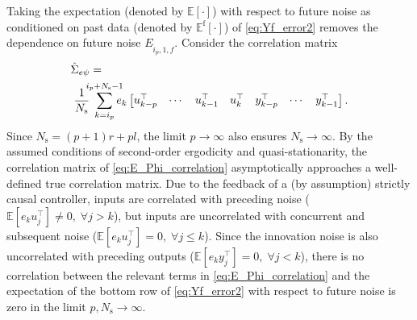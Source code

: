 Taking the expectation (denoted by $\mathbb{E}[\cdot]$) with respect to future noise as conditioned on past data (denoted by $\mathbb{E}^\mathrm{f}[\cdot]$) of \eqref{eq:Yf_error2} removes the dependence on future noise $E_{\hat{i}_p,1,f}$. Consider the correlation matrix
\begin{align}\label{eq:E_Phi_correlation}
    \begin{split}
        &\hat{\Sigma}_{e\psi} = \\
        &\;\frac{1}{N_\mathrm{s}}\;\sum\limits_{k=i_p}^{\mathclap{i_p+N_\mathrm{s}-1}} e_k \begin{bmatrix}u_{k-p}^\top & \cdots & u_{k-1}^\top & u_k^\top & y_{k-p}^\top & \cdots & y_{k-1}^\top \end{bmatrix}.
    \end{split}
\end{align}
Since $N_\mathrm{s}=(p+1)r+pl$, the limit $p\rightarrow\infty$ also ensures $N_\mathrm{s}\rightarrow\infty$. By the assumed conditions of second-order ergodicity and quasi-stationarity, the correlation matrix of \eqref{eq:E_Phi_correlation} asymptotically approaches a well-defined true correlation matrix. Due to the feedback of a (by assumption) strictly causal controller, inputs are correlated with preceding noise (${\mathbb{E}[e_k u_j^\top]\neq0,\; \forall j>k}$), but inputs are uncorrelated with concurrent and subsequent noise (${\mathbb{E}[e_k u_j^\top]=0,\; \forall j\leq k}$). Since the innovation noise is also uncorrelated with preceding outputs (${\mathbb{E}[e_k y_j^\top]=0,\; \forall j<k}$), there is no correlation between the relevant terms in \eqref{eq:E_Phi_correlation} and the expectation of the bottom row of \eqref{eq:Yf_error2} with respect to future noise is zero in the limit $p,N_\mathrm{s}\rightarrow\infty$. %

